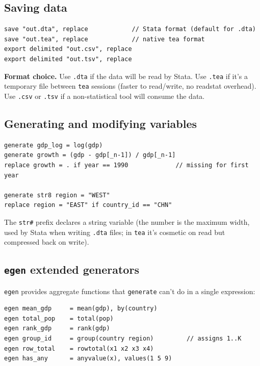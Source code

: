 \documentclass[11pt,letterpaper]{article}
\begin{document}
\subsection{Saving data}

\begin{lstlisting}
save "out.dta", replace            // Stata format (default for .dta)
save "out.tea", replace            // native tea format
export delimited "out.csv", replace
export delimited "out.tsv", replace
\end{lstlisting}

\textbf{Format choice.}  Use \texttt{.dta} if the data will be read by
Stata.  Use \texttt{.tea} if it's a temporary file between \texttt{tea}
sessions (faster to read/write, no readstat overhead).  Use \texttt{.csv}
or \texttt{.tsv} if a non-statistical tool will consume the data.

\subsection{Generating and modifying variables}

\begin{lstlisting}
generate gdp_log = log(gdp)
generate growth = (gdp - gdp[_n-1]) / gdp[_n-1]
replace growth = . if year == 1990             // missing for first year

generate str8 region = "WEST"
replace region = "EAST" if country_id == "CHN"
\end{lstlisting}

The \texttt{str\#} prefix declares a string variable (the number is the
maximum width, used by Stata when writing \texttt{.dta} files; in
\texttt{tea} it's cosmetic on read but compressed back on write).

\subsection{\texttt{egen} extended generators}

\texttt{egen} provides aggregate functions that \texttt{generate} can't
do in a single expression:

\begin{lstlisting}
egen mean_gdp     = mean(gdp), by(country)
egen total_pop    = total(pop)
egen rank_gdp     = rank(gdp)
egen group_id     = group(country region)         // assigns 1..K
egen row_total    = rowtotal(x1 x2 x3 x4)
egen has_any      = anyvalue(x), values(1 5 9)
\end{lstlisting}
\end{document}
